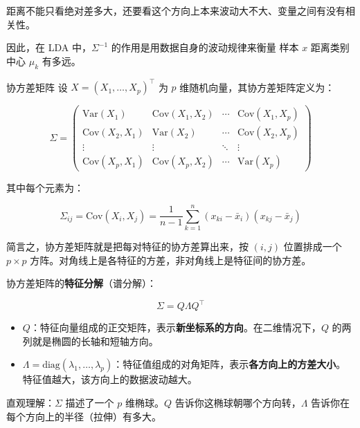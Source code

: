 \begin{note}
距离不能只看绝对差多大，还要看这个方向上本来波动大不大、变量之间有没有相关性。

因此，在 LDA 中，\(\Sigma^{-1}\) 的作用是用数据自身的波动规律来衡量
样本 \(x\) 距离类别中心 \(\mu_k\) 有多远。
\end{note}
\begin{definition}{协方差矩阵}
设 $X = (X_1, \dots, X_p)^\top$ 为 $p$ 维随机向量，其协方差矩阵定义为：

\[
\Sigma = \begin{pmatrix}
\text{Var}(X_1) & \text{Cov}(X_1, X_2) & \cdots & \text{Cov}(X_1, X_p) \\
\text{Cov}(X_2, X_1) & \text{Var}(X_2) & \cdots & \text{Cov}(X_2, X_p) \\
\vdots & \vdots & \ddots & \vdots \\
\text{Cov}(X_p, X_1) & \text{Cov}(X_p, X_2) & \cdots & \text{Var}(X_p)
\end{pmatrix}
\]

其中每个元素为：

\[
\Sigma_{ij} = \text{Cov}(X_i, X_j) = \frac{1}{n-1}\sum_{k=1}^{n}(x_{ki} - \bar{x}_i)(x_{kj} - \bar{x}_j)
\]

简言之，协方差矩阵就是把每对特征的协方差算出来，按 $(i,j)$ 位置排成一个 $p \times p$ 方阵。对角线上是各特征的方差，非对角线上是特征间的协方差。
\end{definition}
\begin{dxtips}[拿到一个矩阵就要分解它]
协方差矩阵的\textbf{特征分解}（谱分解）：

\[
\Sigma = Q \Lambda Q^\top
\]

\begin{itemize}
    \item $Q$：特征向量组成的正交矩阵，表示\textbf{新坐标系的方向}。在二维情况下，$Q$ 的两列就是椭圆的长轴和短轴方向。
    \item $\Lambda = \text{diag}(\lambda_1, \dots, \lambda_p)$：特征值组成的对角矩阵，表示\textbf{各方向上的方差大小}。特征值越大，该方向上的数据波动越大。
\end{itemize}

直观理解：$\Sigma$ 描述了一个 $p$ 维椭球。$Q$ 告诉你这椭球朝哪个方向转，$\Lambda$ 告诉你在每个方向上的半径（拉伸）有多大。
\end{dxtips}
